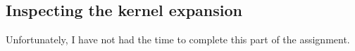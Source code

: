 \subsection{Inspecting the kernel expansion}

Unfortunately, I have not had the time to complete this part of the assignment.